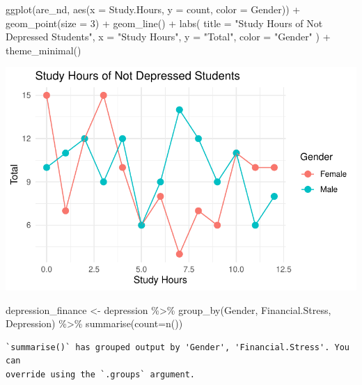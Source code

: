 \documentclass[
  letterpaper,
  DIV=11,
  numbers=noendperiod]{scrartcl}
\newenvironment{Shaded}{\begin{snugshade}}{\end{snugshade}}
\newcommand{\AttributeTok}[1]{\textcolor[rgb]{0.40,0.45,0.13}{#1}}
\newcommand{\DecValTok}[1]{\textcolor[rgb]{0.68,0.00,0.00}{#1}}
\newcommand{\FunctionTok}[1]{\textcolor[rgb]{0.28,0.35,0.67}{#1}}
\newcommand{\NormalTok}[1]{\textcolor[rgb]{0.00,0.23,0.31}{#1}}
\newcommand{\OtherTok}[1]{\textcolor[rgb]{0.00,0.23,0.31}{#1}}
\newcommand{\SpecialCharTok}[1]{\textcolor[rgb]{0.37,0.37,0.37}{#1}}
\newcommand{\StringTok}[1]{\textcolor[rgb]{0.13,0.47,0.30}{#1}}
\begin{document}
\begin{Shaded}
\begin{Highlighting}[]
\FunctionTok{ggplot}\NormalTok{(are\_nd, }\FunctionTok{aes}\NormalTok{(}\AttributeTok{x =}\NormalTok{ Study.Hours, }\AttributeTok{y =}\NormalTok{ count, }\AttributeTok{color =}\NormalTok{ Gender)) }\SpecialCharTok{+}
  \FunctionTok{geom\_point}\NormalTok{(}\AttributeTok{size =} \DecValTok{3}\NormalTok{) }\SpecialCharTok{+}    
  \FunctionTok{geom\_line}\NormalTok{() }\SpecialCharTok{+}       
  \FunctionTok{labs}\NormalTok{(}
    \AttributeTok{title =} \StringTok{"Study Hours of Not Depressed Students"}\NormalTok{,}
    \AttributeTok{x =} \StringTok{"Study Hours"}\NormalTok{,}
    \AttributeTok{y =} \StringTok{"Total"}\NormalTok{,}
    \AttributeTok{color =} \StringTok{"Gender"}
\NormalTok{  ) }\SpecialCharTok{+}
  \FunctionTok{theme\_minimal}\NormalTok{() }
\end{Highlighting}
\end{Shaded}

\includegraphics{Data_files/figure-pdf/unnamed-chunk-9-2.pdf}

\begin{Shaded}
\begin{Highlighting}[]
\NormalTok{depression\_finance }\OtherTok{\textless{}{-}}\NormalTok{ depression }\SpecialCharTok{\%\textgreater{}\%} \FunctionTok{group\_by}\NormalTok{(Gender, Financial.Stress, Depression) }\SpecialCharTok{\%\textgreater{}\%} \FunctionTok{summarise}\NormalTok{(}\AttributeTok{count=}\FunctionTok{n}\NormalTok{())}
\end{Highlighting}
\end{Shaded}

\begin{verbatim}
`summarise()` has grouped output by 'Gender', 'Financial.Stress'. You can
override using the `.groups` argument.
\end{verbatim}
\end{document}
